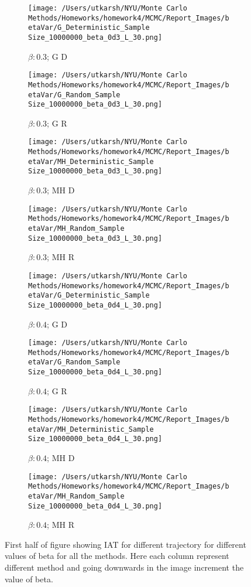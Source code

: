 \documentclass[11pt]{article}
\begin{document}
\begin{figure}[H]
	\begin{subfigure}{.23\textwidth}
		\texttt{[image: /Users/utkarsh/NYU/Monte Carlo Methods/Homeworks/homework4/MCMC/Report\_Images/betaVar/G\_Deterministic\_Sample Size\_10000000\_beta\_0d3\_L\_30.png]}
		\caption{$\beta: 0.3$; G D}
	\end{subfigure}
	\begin{subfigure}{.23\textwidth}
		\texttt{[image: /Users/utkarsh/NYU/Monte Carlo Methods/Homeworks/homework4/MCMC/Report\_Images/betaVar/G\_Random\_Sample Size\_10000000\_beta\_0d3\_L\_30.png]}
		\caption{$\beta: 0.3$; G R}
	\end{subfigure}
	\begin{subfigure}{.23\textwidth}
		\texttt{[image: /Users/utkarsh/NYU/Monte Carlo Methods/Homeworks/homework4/MCMC/Report\_Images/betaVar/MH\_Deterministic\_Sample Size\_10000000\_beta\_0d3\_L\_30.png]}
		\caption{$\beta: 0.3$; MH D}
	\end{subfigure}
	\begin{subfigure}{.23\textwidth}
		\texttt{[image: /Users/utkarsh/NYU/Monte Carlo Methods/Homeworks/homework4/MCMC/Report\_Images/betaVar/MH\_Random\_Sample Size\_10000000\_beta\_0d3\_L\_30.png]}
		\caption{$\beta: 0.3$; MH R}
	\end{subfigure}

	\begin{subfigure}{.23\textwidth}
		\texttt{[image: /Users/utkarsh/NYU/Monte Carlo Methods/Homeworks/homework4/MCMC/Report\_Images/betaVar/G\_Deterministic\_Sample Size\_10000000\_beta\_0d4\_L\_30.png]}
		\caption{$\beta: 0.4$; G D}
	\end{subfigure}
	\begin{subfigure}{.23\textwidth}
		\texttt{[image: /Users/utkarsh/NYU/Monte Carlo Methods/Homeworks/homework4/MCMC/Report\_Images/betaVar/G\_Random\_Sample Size\_10000000\_beta\_0d4\_L\_30.png]}
		\caption{$\beta: 0.4$; G R}
	\end{subfigure}
	\begin{subfigure}{.23\textwidth}
		\texttt{[image: /Users/utkarsh/NYU/Monte Carlo Methods/Homeworks/homework4/MCMC/Report\_Images/betaVar/MH\_Deterministic\_Sample Size\_10000000\_beta\_0d4\_L\_30.png]}
		\caption{$\beta: 0.4$; MH D}
	\end{subfigure}
	\begin{subfigure}{.23\textwidth}
		\texttt{[image: /Users/utkarsh/NYU/Monte Carlo Methods/Homeworks/homework4/MCMC/Report\_Images/betaVar/MH\_Random\_Sample Size\_10000000\_beta\_0d4\_L\_30.png]}
		\caption{$\beta: 0.4$; MH R}
	\end{subfigure}
	\caption{First half of figure showing IAT for different trajectory for different values of beta for all the methods. Here each column represent different method and going downwards in the image increment the value of beta.}
	\label{fig:iat_betas_part1}
\end{figure}
\end{document}

